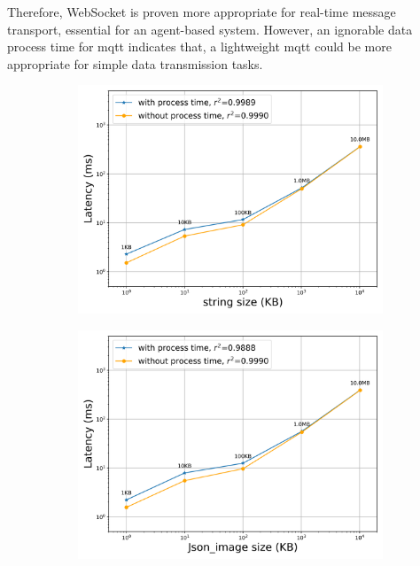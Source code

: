 Therefore, WebSocket is proven more appropriate for real-time message transport, 
essential for an agent-based system. However, an ignorable data process time for \gls{mqtt} 
indicates that, a lightweight \gls{mqtt} could be more appropriate for simple data 
transmission tasks.


\begin{figure}[htb]
    \begin{subfigure}[b]{0.49\textwidth}
        \centering
        \includegraphics[width=\textwidth]{figures/tests/proportional_tests/Rest_log_Average_string_messages_sending_time_of_100_tests.png}\hfill 
        \caption{} \label{fig: proportional-rest-stringsize-c}
    \end{subfigure}
    \begin{subfigure}[b]{0.49\textwidth}
        \centering
        \includegraphics[width=\textwidth]{figures/tests/proportional_tests/Rest_log_Average_string_messages_receiving_time_of_100_tests.png}\hfill 
        \caption{} \label{fig: proportional-rest-stringsize-d}
    \end{subfigure}


\end{figure}
